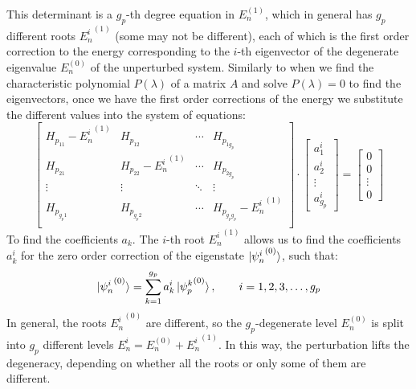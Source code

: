 This determinant is a $g_p$-th degree equation in $E_n^{(1)}$, which in general has $g_p$ different roots ${E_n^i}^{(1)}$ (some may not be different), each of which is the first order correction to the energy corresponding to the $i$-th eigenvector of the degenerate eigenvalue $E_n^{(0)}$ of the unperturbed system. Similarly to when we find the characteristic polynomial $P(\lambda)$ of a matrix $A$ and solve $P(\lambda)=0$ to find the eigenvectors, once we have the first order corrections of the energy we substitute the different values into the system of equations:
\begin{equation}
    \begin{bmatrix}
        H_{p_{11}} - {E_n^i}^{(1)} & H_{p_{12}} & \cdots & H_{p_{1g_p}} \\
        H_{p_{21}} & H_{p_{22}}- {E_n^i}^{(1)} & \cdots & H_{p_{2g_p}} \\
        \vdots & \vdots & \ddots & \vdots \\
        H_{p_{g_p1}} & H_{p_{g_p2}} & \cdots & H_{p_{g_pg_p}}- {E_n^i}^{(1)} \\
    \end{bmatrix}\cdot \begin{bmatrix}
        a_1^i \\ a_2^i \\ \vdots \\ a_{g_p}^i 
    \end{bmatrix} = \begin{bmatrix}
        0 \\ 0 \\ \vdots \\ 0 
    \end{bmatrix}
\end{equation}
To find the coefficients $a_k$. The $i$-th root ${E_n^i}^{(1)}$ allows us to find the coefficients $a_k^i$ for the zero order correction of the eigenstate $\ket{{\psi_n^i}^{(0)}}$, such that:
\begin{equation}
    \ket{{\psi_n^i}^{(0)}} = \sum_{k=1}^{g_p} a_k^i\ket{{\psi_p^k}^{(0)}}, \qquad i = 1, 2, 3, \dots, g_p
\end{equation}
In general, the roots ${E_n^i}^{(0)}$ are different, so the $g_p$-degenerate level $E_n^{(0)}$ is split into $g_p$ different levels $E_n^i = E_n^{(0)} + {E_n^i}^{(1)}$. In this way, the perturbation lifts the degeneracy, depending on whether all the roots or only some of them are different.

